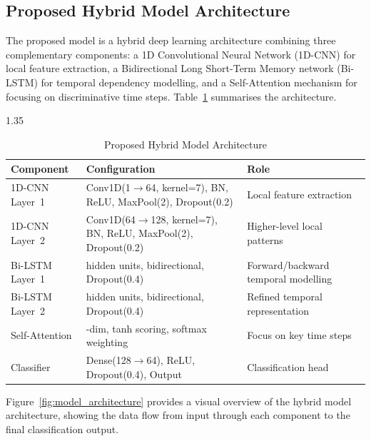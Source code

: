 \subsection{Proposed Hybrid Model Architecture}

The proposed model is a hybrid deep learning architecture combining three complementary components: a 1D Convolutional Neural Network (1D-CNN) for local feature extraction, a Bidirectional Long Short-Term Memory network (Bi-LSTM) for temporal dependency modelling, and a Self-Attention mechanism for focusing on discriminative time steps. Table~\ref{table:model_architecture} summarises the architecture.

\begin{table}[H]
  \centering
  \begin{spacing}{1.35}
  \caption{Proposed Hybrid Model Architecture}\vspace{0.7em}
  \label{table:model_architecture}
    {\small
    \begin{tabular}{|>{\raggedright\arraybackslash}p{2.8cm}|>{\raggedright\arraybackslash}p{6.5cm}|>{\raggedright\arraybackslash}p{4.0cm}|}
    \hline
    \textbf{Component} & \textbf{Configuration} & \textbf{Role} \\
    \hline
    1D-CNN Layer~1 & Conv1D(1$\rightarrow$64, kernel=7), BN, ReLU, MaxPool(2), Dropout(0.2) & Local feature extraction \\
    \hline
    1D-CNN Layer~2 & Conv1D(64$\rightarrow$128, kernel=7), BN, ReLU, MaxPool(2), Dropout(0.2) & Higher-level local patterns \\
    \hline
    Bi-LSTM Layer~1 & 128 hidden units, bidirectional, Dropout(0.4) & Forward/backward temporal modelling \\
    \hline
    Bi-LSTM Layer~2 & 64 hidden units, bidirectional, Dropout(0.4) & Refined temporal representation \\
    \hline
    Self-Attention & 64-dim, tanh scoring, softmax weighting & Focus on key time steps \\
    \hline
    Classifier & Dense(128$\rightarrow$64), ReLU, Dropout(0.4), Output & Classification head \\
    \hline
    \end{tabular}
    }
  \end{spacing}
\end{table}

Figure~\ref{fig:model_architecture} provides a visual overview of the hybrid model architecture, showing the data flow from input through each component to the final classification output.

